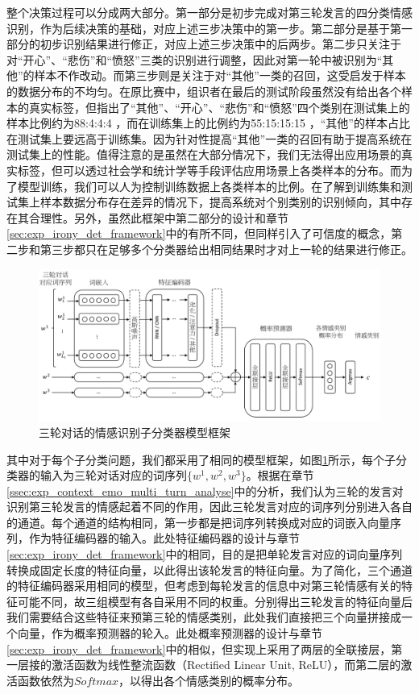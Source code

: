 整个决策过程可以分成两大部分。第一部分是初步完成对第三轮发言的四分类情感识别，作为后续决策的基础，对应上述三步决策中的第一步。第二部分是基于第一部分的初步识别结果进行修正，对应上述三步决策中的后两步。第二步只关注于对“开心”、“悲伤”和“愤怒”三类的识别进行调整，因此对第一轮中被识别为“其他”的样本不作改动。而第三步则是关注于对“其他”一类的召回，这受启发于样本的数据分布的不均匀。在原比赛中，组识者在最后的测试阶段虽然没有给出各个样本的真实标签，但指出了“其他”、“开心”、“悲伤”和“愤怒”四个类别在测试集上的样本比例约为88:4:4:4 ，而在训练集上的比例约为55:15:15:15 ，“其他”的样本占比在测试集上要远高于训练集。因为针对性提高“其他”一类的召回有助于提高系统在测试集上的性能。值得注意的是虽然在大部分情况下，我们无法得出应用场景的真实标签，但可以透过社会学和统计学等手段评估应用场景上各类样本的分布。而为了模型训练，我们可以人为控制训练数据上各类样本的比例。在了解到训练集和测试集上样本数据分布存在差异的情况下，提高系统对个别类别的识别倾向，其中存在其合理性。另外，虽然此框架中第二部分的设计和章节\ref{sec:exp_irony_det_framework}中的有所不同，但同样引入了可信度的概念，第二步和第三步都只在足够多个分类器给出相同结果时才对上一轮的结果进行修正。

\begin{figure}[H]
  \centering
  \includegraphics[width=\textwidth]{img/context_emo_cls_framework.pdf}
  \caption{三轮对话的情感识别子分类器模型框架}
  \label{fig:context_emo_cls_framework}
\end{figure}

其中对于每个子分类问题，我们都采用了相同的模型框架，如图\ref{fig:context_emo_cls_framework}所示，每个子分类器的输入为三轮对话对应的词序列$\{w^1, w^2, w^3\}$。根据在章节\ref{ssec:exp_context_emo_multi_turn_analyse}中的分析，我们认为三轮的发言对识别第三轮发言的情感起着不同的作用，因此三轮发言对应的词序列分别进入各自的通道。每个通道的结构相同，第一步都是把词序列转换成对应的词嵌入向量序列，作为特征编码器的输入。此处特征编码器的设计与章节\ref{sec:exp_irony_det_framework}中的相同，目的是把单轮发言对应的词向量序列转换成固定长度的特征向量，以此得出该轮发言的特征向量。为了简化，三个通道的特征编码器采用相同的模型，但考虑到每轮发言的信息中对第三轮情感有关的特征可能不同，故三组模型有各自采用不同的权重。分别得出三轮发言的特征向量后我们需要结合这些特征来预第三轮的情感类别，此处我们直接把三个向量拼接成一个向量，作为概率预测器的轮入。此处概率预测器的设计与章节\ref{sec:exp_irony_det_framework}中的相似，但实现上采用了两层的全联接层，第一层接的激活函数为线性整流函数（Rectified Linear Unit, ReLU），而第二层的激活函数依然为$Softmax$，以得出各个情感类别的概率分布。

